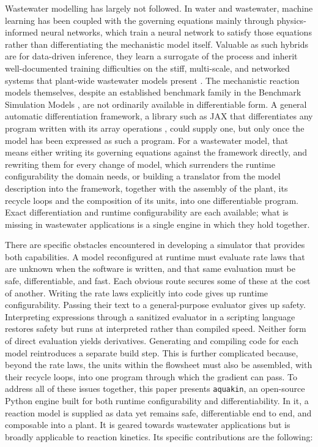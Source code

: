 \documentclass{article}
\begin{document}
Wastewater modelling has largely not followed. In water and wastewater, machine learning has been coupled with the governing equations mainly through physics-informed neural networks, which train a neural network to satisfy those equations rather than differentiating the mechanistic model itself. Valuable as such hybrids are for data-driven inference, they learn a surrogate of the process and inherit well-documented training difficulties on the stiff, multi-scale, and networked systems that plant-wide wastewater models present \citep{dibella2026}. The mechanistic reaction models themselves, despite an established benchmark family in the Benchmark Simulation Models \citep{copp2002, alex2008, gernaey2014}, are not ordinarily available in differentiable form. A general automatic differentiation framework, a library such as JAX that differentiates any program written with its array operations \citep{jax2018github}, could supply one, but only once the model has been expressed as such a program. For a wastewater model, that means either writing its governing equations against the framework directly, and rewriting them for every change of model, which surrenders the runtime configurability the domain needs, or building a translator from the model description into the framework, together with the assembly of the plant, its recycle loops and the composition of its units, into one differentiable program. Exact differentiation and runtime configurability are each available; what is missing in wastewater applications is a single engine in which they hold together.

There are specific obstacles encountered in developing a simulator that provides both capabilities. A model reconfigured at runtime must evaluate rate laws that are unknown when the software is written, and that same evaluation must be safe, differentiable, and fast. Each obvious route secures some of these at the cost of another. Writing the rate laws explicitly into code gives up runtime configurability. Passing their text to a general-purpose evaluator gives up safety. Interpreting expressions through a sanitized evaluator in a scripting language restores safety but runs at interpreted rather than compiled speed. Neither form of direct evaluation yields derivatives. Generating and compiling code for each model reintroduces a separate build step. This is further complicated because, beyond the rate laws, the units within the flowsheet must also be assembled, with their recycle loops, into one program through which the gradient can pass. To address all of these issues together, this paper presents \texttt{aquakin}, an open-source Python engine built for both runtime configurability and differentiability. In it, a reaction model is supplied as data yet remains safe, differentiable end to end, and composable into a plant. It is geared towards wastewater applications but is broadly applicable to reaction kinetics. Its specific contributions are the following:
\end{document}

